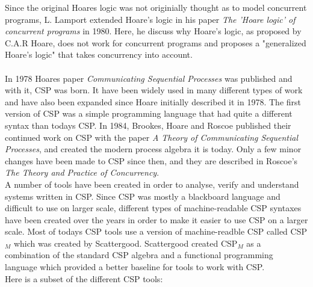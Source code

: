 \documentclass[a4paper]{report}
\newcommand{\cspm}{CSP$_M$ }
\begin{document}
Since the original Hoares logic was not originially thought as to model concurrent programs, L. Lamport extended Hoare's logic in his paper \textit{The 'Hoare logic' of concurrent programs}\cite{Lamport1980} in 1980. Here, he discuss why Hoare's logic, as proposed by C.A.R Hoare, does not work for concurrent programs and proposes a "generalized Hoare's logic" that takes concurrency into account. \\\\
In 1978 Hoares paper \textit{Communicating Sequential Processes} was published and with it, CSP was born. It have been widely used in many different types of work and have also been expanded since Hoare initially described it in 1978\cite{Abdallah2005}. The first version of CSP was a simple programming language that had quite a different syntax than todays CSP. In 1984, Brookes, Hoare and Roscoe published their continued work on CSP with the paper \textit{A Theory of Communicating Sequential Processes}\cite{Brookes1984}, and created the modern process algebra it is today. Only a few minor changes have been made to CSP since then, and they are described in Roscoe's \textit{The Theory and Practice of Concurrency}\cite{Roscoe1997}.\\
A number of tools have been created in order to analyse, verify and understand systems written in CSP. Since CSP was mostly a blackboard language and difficult to use on larger scale, different types of machine-readable CSP syntaxes have been created over the years in order to make it easier to use CSP on a larger scale. Most of todays CSP tools use a version of machine-readble CSP called \cspm{} which was created by Scattergood\cite{Scattergood1998}. Scattergood created \cspm{} as a combination of the standard CSP algebra and a functional programming language which provided a better baseline for tools to work with CSP.\\
Here is a subset of the different CSP tools:
\end{document}
